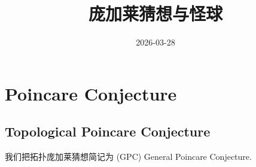 \documentclass[
]{ctexart}
\title{庞加莱猜想与怪球}
\author{}
\date{2026-03-28}
\renewcommand*\contentsname{Table of contents}
\newcommand\contentsname{Table of contents}
\begin{document}
\maketitle

\renewcommand*\contentsname{Table of contents}
{
\hypersetup{linkcolor=}
\setcounter{tocdepth}{3}
\tableofcontents
}

\section{Poincare Conjecture}\label{poincare-conjecture}

\subsection{Topological Poincare
Conjecture}\label{topological-poincare-conjecture}

我们把拓扑庞加莱猜想简记为 (GPC) General Poincare Conjecture.
\end{document}
